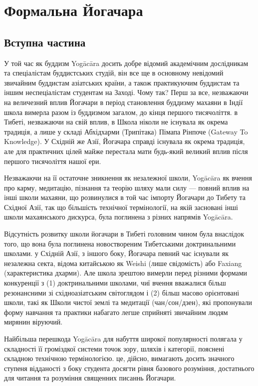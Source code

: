 \section{Формальна Йогачара}

\subsection*{Вступна частина}

У той час як буддизм Yogācāra досить добре відомий академічним дослідникам та спеціалістам
буддистських студій, він все ще в основному невідомий звичайним буддистам
азіатських країни, а також практикуючим буддистам та іншим неспеціалістам
студентам на Заході. Чому так? Перш за все, незважаючи на величезний вплив
Йогачари в період становлення буддизму махаяни в Індії школа вимерла разом
із буддизмом загалом, до кінця першого тисячоліття. в Тибеті, незважаючи
на свій вплив, в Школа ніколи не існувала як окрема традиція, а лише у
складі Абхідхарми (Трипітака) Пімапа Рінпоче (Gateway To Knowledge).
У Східній же Азії, Йогачара справді існувала як окрема традиція, але
для практичних цілей майже перестала мати будь-який великий вплив після
першого тисячоліття нашої ери.

Незважаючи на її остаточне зникнення як незалежної школи, Yogācāra як
вчення про карму, медитацію, пізнання та теорію шляху мали силу ---
повний вплив на інші школи махаяни, що розвинулися в той час імпорту
Йогачари до Тибету та Східної Азії, так що більшість технічної термінології,
на якій засновані інші школи махаянського дискурса, була поглинена з різних
напрямів Yogācāra.

Відсутність розвитку школи йогачари в Тибеті головним чином була
внаслідок того, що вона була поглинена новоствореним Тибетськими
доктринальними школами. у Східній Азії, з іншого боку, Йогачара
певний час існували як незалежна секта, відома китайською як Weishi (лише
свідомість) або Faxiang (характеристика дхарми). Але школа зрештою
вимерли перед різними формами конкуренції з (1) доктринальними школами,
чиї вчення вважалися більш резонансними зі східноазіатським світоглядом
і (2) більш масово орієнтовані школи, такі як Школи чистої землі та
медитації (чан/сон/дзен), які пропонували форму навчання та практики
набагато легше сприйняті звичайним людям мирянин віруючий.

Найбільша перешкода Yogācāra для набуття широкої популярності полягала
у складності її громіздкої системи точок зору, шляхів і категорії,
пояснені складною технічною термінологією. це, дійсно, вимагають досить
значного ступеня відданості з боку студента досягти рівня базового
розуміння, достатнього для читання та розуміння священних писаннь Йогачари.

